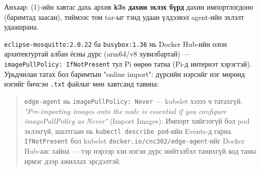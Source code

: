 \begin{Shaded}
\begin{Highlighting}[]

\KeywordTok{|} 
\end{Highlighting}
\end{Shaded}

Анхаар: (1)-ийн хавтас дахь архив \textbf{k3s дахин эхлэх бүрд} дахин импортлогдоно (баримтад заасан), тиймээс том tar-ыг тэнд удаан үлдээвэл agent-ийн эхлэлт удаашрана.

\texttt{eclipse-mosquitto:\allowbreak{}2.\allowbreak{}0.\allowbreak{}22} ба \texttt{busybox:1.36} нь Docker Hub-ийн олон архитектуртай албан ёсны дүрс (arm64/v8 хувилбартай) --- \texttt{imagePullPolicy:\allowbreak{}\ IfNotPresent} тул Pi өөрөө татна (Pi-д интернэт хэрэгтэй). Урьдчилан татах бол баримтын "online import": дүрсийн нэрсийг нэг мөрөнд нэгийг бичсэн \texttt{.txt} файлыг мөн хавтсанд тавина:

\begin{Shaded}
\begin{Highlighting}[]
  \KeywordTok{\textbackslash{}}
  \KeywordTok{|} 
\end{Highlighting}
\end{Shaded}

\begin{quote}
\texttt{edge-agent} нь \texttt{imagePullPolicy:\allowbreak{}\ Never} --- kubelet хэзээ ч татахгүй. \emph{"Pre-importing images onto the node is essential if you configure imagePullPolicy as Never"} (Import Images). Импорт хийгээгүй бол pod эхлэхгүй, шалтгаан нь \texttt{kubectl\ describe\ pod}-ийн Events-д гарна. \texttt{IfNotPresent} бол kubelet \texttt{docker.\allowbreak{}io/\allowbreak{}cnc302/\allowbreak{}edge-agent}-ийг Docker Hub-аас хайна --- тэр нэрээр хэн нэгэн дүрс нийтэлбэл танихгүй код таны ирмэг дээр ажиллах эрсдэлтэй.
\end{quote}

